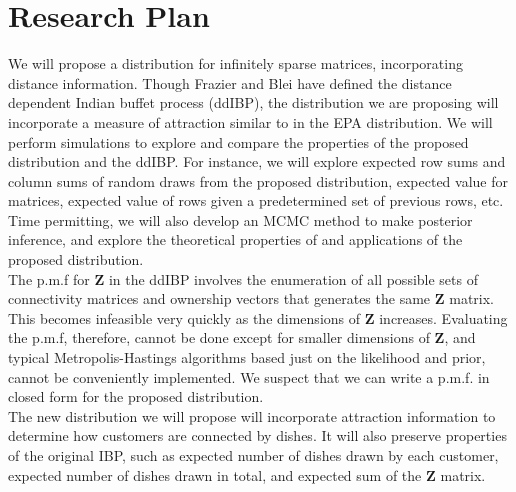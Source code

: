 \chapter{Research Plan}%

We will propose a distribution for infinitely sparse matrices, incorporating
distance information. Though Frazier and Blei have defined the distance
dependent Indian buffet process (ddIBP), the distribution we are proposing will
incorporate a measure of attraction similar to in the EPA distribution. We will
perform simulations to explore and compare the properties of the proposed
distribution and the ddIBP. For instance, we will explore expected row sums and
column sums of random draws from the proposed distribution, expected value for
matrices, expected value of rows given a predetermined set of previous rows,
etc. Time permitting, we will also develop an MCMC method to make posterior
inference, and explore the theoretical properties of and applications of the
proposed distribution. \\

\noindent
The p.m.f for $\bm Z$ in the ddIBP involves the enumeration of all possible sets
of connectivity matrices and ownership vectors that generates the same $\bm Z$ 
matrix. This becomes infeasible very quickly as the dimensions of $\bm Z$ 
increases. Evaluating the p.m.f, therefore, cannot be done except for smaller
dimensions of $\bm Z$, and typical Metropolis-Hastings algorithms based just on 
the likelihood and prior, cannot be conveniently implemented. We suspect that
we can write a p.m.f. in closed form for the proposed distribution.\\

\noindent
The new distribution we will propose will incorporate attraction information to
determine how customers are connected by dishes. It will also preserve properties 
of the original IBP, such as expected number of dishes drawn by each customer,
expected number of dishes drawn in total, and expected sum of the $\bm Z$ matrix.

